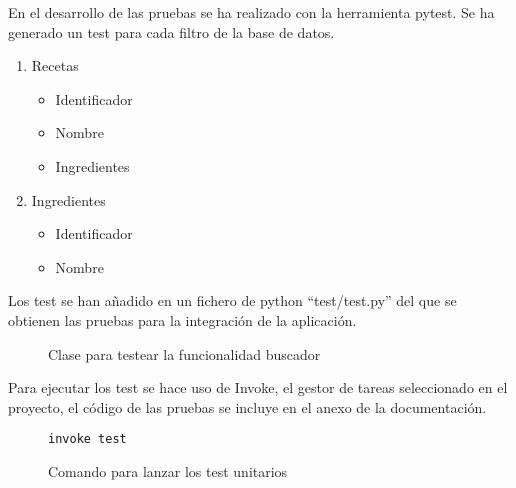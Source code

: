 En el desarrollo de las pruebas se ha realizado con la herramienta pytest. Se ha generado un \gls{test} para cada filtro de la base de datos.
\begin{enumerate}
    \item Recetas
    \begin{itemize}
        \item Identificador
        \item Nombre
        \item Ingredientes
    \end{itemize}
    \item Ingredientes
    \begin{itemize}
        \item Identificador
        \item Nombre
    \end{itemize}
\end{enumerate}

Los test se han añadido en un fichero de python ``test/test.py'' del que se obtienen las pruebas para la integración de la aplicación.
\begin{figure}[h!]
    \centering
    \caption{Clase para testear la funcionalidad buscador}
    \label{fig:test}
\end{figure}

Para ejecutar los test se hace uso de Invoke, el gestor de tareas seleccionado en el proyecto, el código de las pruebas se incluye en el anexo de la documentación. 

\begin{figure}
    \centering
    \begin{lstlisting}[style=consola]
        invoke test
    \end{lstlisting}
    \caption{Comando para lanzar los test unitarios}
    \label{cmd:test}
\end{figure}